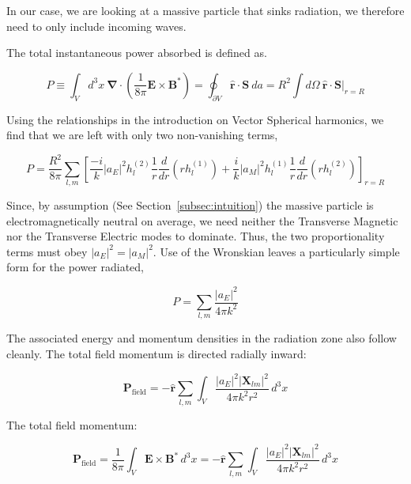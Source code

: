 \documentclass {article}
\renewcommand\vec{\mathbf}
\let\OldS\nabla
\renewcommand{\nabla}{\boldsymbol{\OldS}}
\let\OldHat\hat
\renewcommand{\hat}[1]{\OldHat{\mathbf{#1}}}
\begin{document}
In our case, we are looking at a massive particle that sinks radiation, we therefore need to only include incoming waves.

The total instantaneous power absorbed is defined as.

\begin{equation}
P \equiv \int_V d^3x ~ \nabla \cdot \left( \frac 1 {8 \pi} \vec E \times \vec B^*\right) = \oint_{\partial V} \hat r \cdot \vec S ~ da = R^2 \int d\Omega ~ \hat r \cdot \vec S \bigg|_{r = R}
\end{equation}

Using the relationships in the introduction on Vector Spherical harmonics, we find that we are left with only two non-vanishing terms,

\begin{equation}
P = \frac {R^2}{8 \pi} \sum_{l, m} \left[  \frac {-i} k |a_E|^2 h_l^{(2)} \frac 1 r \frac d {dr} \left( rh_l^{(1)} \right) + \frac i k |a_M|^2 h_l^{(1)} \frac 1 r \frac d {dr} \left( rh_l^{(2)}\right) \right]_{r=R}
\end{equation}

Since, by assumption (See Section~\ref{subsec:intuition}) the massive particle is electromagnetically neutral on average, we need neither the Transverse Magnetic nor the Transverse Electric modes to dominate. Thus, the two proportionality terms must obey $|a_E|^2 = |a_M|^2$. Use of the Wronskian leaves a particularly simple form for the power radiated,


\begin{equation}
P = \sum_{l,m} \frac {|a_E|^2} { 4 \pi k^2}
\end{equation}

The associated energy and momentum densities in the radiation zone also follow cleanly. The total field momentum is directed radially inward:

\begin{equation}
\vec{P}_{\text{field}} = -\hat{r} \sum_{l,m} \int_V \frac{|a_E|^2 |\vec{X}_{lm}|^2}{4\pi k^2 r^2} \, d^3x
\end{equation}



The total field momentum:

\begin{equation}
\vec{P}_{\text{field}} = \frac{1}{8\pi} \int_V \vec{E} \times \vec{B}^* \, d^3x
= -\hat{r} \sum_{l,m} \int_V \frac{|a_E|^2 |\vec{X}_{lm}|^2}{4\pi k^2 r^2} \, d^3x
\label{eq:mom}
\end{equation}
\end{document}
